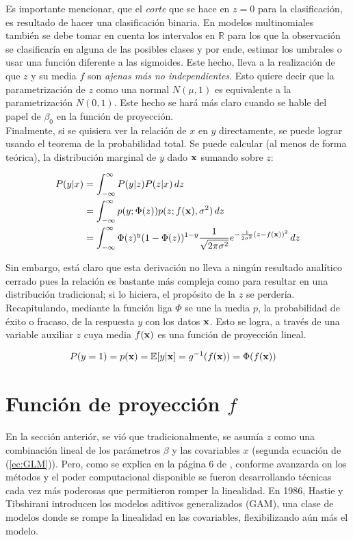 \documentclass[../Main/Main.tex]{subfiles}
\begin{document}
Es importante mencionar, que el \textit{corte} que se hace en $z = 0$ para la clasificación, es resultado de hacer una clasificación binaria. En modelos multinomiales también se debe tomar en cuenta los intervalos en $\mathbb{R}$ para los que la observación se clasificaría en alguna de las posibles clases y por ende, estimar los umbrales o usar una función diferente a las sigmoides. Este hecho, lleva a la realización de que $z$ y su media $f$ son \textit{ajenas más no independientes}. Esto quiere decir que la parametrización de $z$ como una normal $N(\mu,1)$ es equivalente a la parametrización $N(0,1)$. Este hecho se hará más claro cuando se hable del papel de $\beta_0$ en la función de proyección. \\ 

Finalmente, si se quisiera ver la relación de $x$ en $y$ directamente, se puede lograr usando el teorema de la probabilidad total. Se puede calcular (al menos de forma teórica), la distribución marginal de $y$ dado $\mathbf{x}$ sumando sobre $z$:

\begin{align*}
P(y|x) 	&= \int_{-\infty}^\infty P(y|z)P(z|x)\, dz \\
		&= \int_{-\infty}^\infty p(y;\Phi(z))p(z;f(\mathbf{x}),\sigma^2)\, dz \\
		&= \int_{-\infty}^\infty \Phi(z)^y (1-\Phi(z))^{1-y}
		\dfrac{1}{\sqrt{2\pi\sigma^2}}e^{-\frac{1}{2\sigma^2}(z-f(\mathbf{x}))^2} \, dz
\end{align*}

Sin embargo, está claro que esta derivación no lleva a ningún resultado analítico cerrado pues la relación es bastante más compleja como para resultar en una distribución  tradicional; si lo hiciera, el propósito de la $z$ se perdería.\\

Recapitulando, mediante la función liga $\Phi$ se une la media $p$, la probabilidad de éxito o fracaso, de la respuesta $y$ con los datos $\mathbf{x}$. Esto se logra, a través de una variable auxiliar $z$ cuya media $f(\mathbf{x})$ es una función de proyección lineal. 

\begin{align} \label{ec:RegMedia}
	P(y = 1) = p(\mathbf{x}) &=\mathbb{E}[y|\mathbf{x}] = g^{-1}(f(\mathbf{x})) = \Phi(f(\mathbf{x}))
\end{align}

\section{Función de proyección $f$} \label{sec:FuncProy} 
En la sección anteriór, se vió que tradicionalmente, se asumía $z$ como una combinación lineal de los parámetros $\beta$ y las covariables $x$ (segunda ecuación de (\ref{ec:GLM})). Pero, como se explica en la página 6 de \autocite{james2013introduction}, conforme avanzarda on los métodos y el poder computacional disponible se fueron desarrollando técnicas cada vez más poderosas que permitieron romper la linealidad. En 1986, Hastie y Tibshirani introducen los modelos aditivos generalizados (GAM), una clase de modelos donde se rompe la linealidad en las covariables, flexibilizando aún más el  modelo.\\
\end{document}

